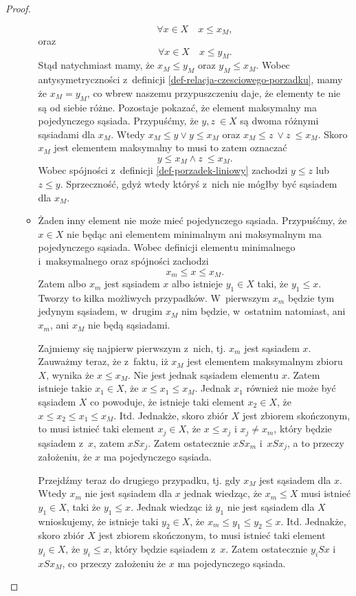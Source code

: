\documentclass[12pt,a4paper]{report}
\begin{document}
\begin{proof}
\begin{enumerate}
\begin{itemize}
$$
\forall x \in X \quad x \leq x_M,
$$
oraz 
$$
\forall x \in X \quad x \leq y_M.
$$
Stąd natychmiast mamy, że $x_M \leq y_M$ oraz $y_M \leq  x_M$. Wobec antysymetryczności z~definicji \ref{def-relacja-czesciowego-porzadku}, mamy że $x_M = y_M$, co wbrew naszemu przypuszczeniu daje, że elementy te nie są od siebie różne.
Pozostaje pokazać, że element maksymalny ma pojedynczego sąsiada. Przypuśćmy, że $y, z~\in X$ są dwoma różnymi sąsiadami dla $x_M$. Wtedy $ x_M \leq y \lor y \leq x_M$ oraz $ x_M \leq z~\lor z~\leq x_M$. Skoro $x_M$ jest elementem maksymalny to musi to zatem oznaczać
$$
y \leq x_M \land z~\leq x_M.
$$ 
Wobec spójności z~definicji \ref{def-porzadek-liniowy} zachodzi $y \leq z$ lub $z \leq y$. Sprzeczność, gdyż wtedy któryś z~nich nie mógłby być sąsiadem dla $x_M$.

\item Żaden inny element nie może mieć pojedynczego sąsiada. Przypuśćmy, że $x \in X$ nie będąc ani elementem minimalnym ani maksymalnym ma pojedynczego sąsiada. Wobec definicji elementu minimalnego i~maksymalnego oraz spójności zachodzi
$$
x_m \leq x \leq x_M.
$$
Zatem albo $x_m$ jest sąsiadem $x$ albo istnieje $y_1 \in X$ taki, że $y_1 \leq x$.
Tworzy to kilka możliwych przypadków. W~pierwszym $x_m$ będzie tym jedynym sąsiadem, w~drugim $x_M$ nim będzie, w~ostatnim natomiast, ani $x_m$, ani $x_M$ nie będą sąsiadami.

Zajmiemy się najpierw pierwszym z~nich, tj. $x_m$ jest sąsiadem $x$. Zauważmy teraz, że z~faktu, iż $x_M$ jest elementem maksymalnym zbioru $X$, wynika że $ x \leq x_M$. Nie jest jednak sąsiadem elementu $x$. Zatem istnieje takie $x_1 \in X$, że $x\leq x_1 \leq x_M$. Jednak $x_1$ również nie może być sąsiadem $X$ co powoduje, że istnieje taki element $x_2 \in X$, że $x \leq x_2 \leq x_1 \leq x_M$. Itd. Jednakże, skoro zbiór $X$ jest zbiorem skończonym, to musi istnieć taki element $x_j \in X$, że $x \leq x_j \textrm{ i~} x_j \neq x_m$, który będzie sąsiadem z~$x$, zatem $xSx_j$. Zatem ostatecznie $xSx_m$ i~$xSx_j$, a to przeczy założeniu, że $x$ ma pojedynczego sąsiada. 

Przejdźmy teraz do drugiego przypadku, tj. gdy $x_M$ jest sąsiadem dla $x$. Wtedy $x_m$ nie jest sąsiadem dla $x$ jednak wiedząc, że $x_m \leq X$ musi istnieć $y_1\in X$, taki że $y_1 \leq x$. Jednak wiedząc iż $y_1$ nie jest sąsiadem dla $X$ wnioskujemy, że istnieje taki $y_2 \in X$, że $x_m \leq y_1 \leq y_2 \leq x$. Itd.  Jednakże, skoro zbiór $X$ jest zbiorem skończonym, to musi istnieć taki element $y_i \in X$, że $y_i \leq x$, który będzie sąsiadem z~$x$. Zatem ostatecznie $y_iSx$ i~$xSx_M$, co przeczy założeniu że $x$ ma pojedynczego sąsiada.


\end{itemize}
\end{enumerate}
\end{proof}
\end{document}

